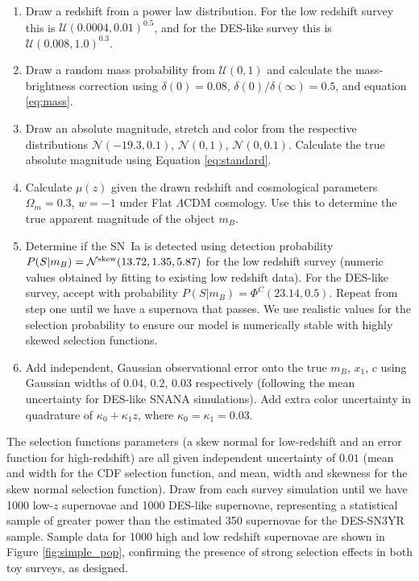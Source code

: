 \documentclass[a4paper,fleqn,usenatbib]{emulateapj}
\begin{document}
\begin{enumerate}[1.]
	\item Draw a redshift from a power law distribution. For the low redshift survey this is $\mathcal{U}(0.0004, 0.01)^{0.5}$, and for the DES-like survey this is $\mathcal{U}(0.008, 1.0)^{0.3}$.
	\item Draw a random mass probability from $\mathcal{U}(0, 1)$ and calculate the mass-brightness correction using $\delta(0) = 0.08$, $\delta(0)/\delta(\infty) = 0.5$, and equation \eqref{eq:mass}.
	\item Draw an absolute magnitude, stretch and color from the respective distributions $\mathcal{N}(-19.3, 0.1)$, $\mathcal{N}(0, 1)$, $\mathcal{N}(0, 0.1)$. Calculate the true absolute magnitude using Equation \eqref{eq:standard}.
	\item Calculate $\mu(z)$ given the drawn redshift and cosmological parameters $\Omega_m = 0.3$, $w = -1$ under Flat $\Lambda$CDM cosmology. Use this to determine the true apparent magnitude of the object $m_B$.
	\item Determine if the SN~Ia is detected using detection probability $P(S|m_B) = \mathcal{N}^{\rm skew}(13.72, 1.35, 5.87)$ for the low redshift survey (numeric values obtained by fitting to existing low redshift data). For the DES-like survey, accept with probability $P(S|m_B) = \Phi^C(23.14, 0.5)$. Repeat from step one until we have a supernova that passes. We use realistic values for the selection probability to ensure our model is numerically stable with highly skewed selection functions.
	\item Add independent, Gaussian observational error onto the true $m_B$, $x_1$, $c$ using Gaussian widths of $0.04$, $0.2$, $0.03$ respectively (following the mean uncertainty for DES-like SNANA simulations). Add extra color uncertainty in quadrature of $\kappa_0 + \kappa_1 z$, where $\kappa_0 = \kappa_1 = 0.03$.
\end{enumerate}

The selection functions parameters (a skew normal for low-redshift and an error function for high-redshift) are all given independent uncertainty of $0.01$ (mean and width for the CDF selection function, and mean, width and skewness for the skew normal selection function). Draw from each survey simulation until we have 1000 low-$z$ supernovae and 1000 DES-like supernovae, representing a statistical sample of greater power than the estimated 350 supernovae for the DES-SN3YR sample. Sample data for 1000 high and low redshift supernovae are shown in Figure \ref{fig:simple_pop}, confirming the presence of strong selection effects in both toy surveys, as designed. 
\end{document}
